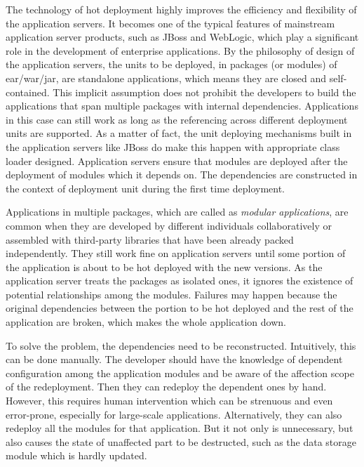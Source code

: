 \documentclass[conference]{IEEEtran}
\begin{document}
The technology of hot deployment highly improves the efficiency and flexibility of the application servers.
It becomes one of the typical features of mainstream application server products, such as JBoss\cite{jboss} and WebLogic\cite{weblogic}, which play a significant role in the development of enterprise applications. By the philosophy of design of the application servers, the units to be deployed, in packages (or modules) of ear/war/jar, are standalone applications, which means they are closed and self-contained. This implicit assumption does not prohibit the developers to build the applications that span multiple packages with internal dependencies. Applications in this case can still work as long as the referencing across different deployment units are supported. As a matter of fact, the unit deploying mechanisms built in the application servers like JBoss do make this happen with appropriate class loader designed. Application servers ensure that modules are deployed after the deployment of modules which it depends on. The dependencies are constructed in the context of deployment unit during the first time deployment.

Applications in multiple packages, which are called as \emph{modular applications}, are common when they are developed by different individuals collaboratively or assembled with third-party libraries that have been already packed independently. They still work fine on application servers until some portion of the application is about to be hot deployed  with the new versions. As the application server treats the packages as isolated ones, it ignores the existence of potential relationships among the modules. Failures may happen because the original dependencies between the portion to be hot deployed and the rest of the application are broken, which makes the whole application down.

To solve the problem, the dependencies need to be reconstructed. Intuitively, this can be done manually. The developer should have the knowledge of dependent configuration among the application modules and be aware of the affection scope of the redeployment. Then they can redeploy the dependent ones by hand. However, this requires human intervention which can be strenuous and even error-prone, especially for large-scale applications. Alternatively, they can also redeploy all the modules for that application. But it not only is unnecessary, but also causes the state of unaffected part to be destructed, such as the data storage module which is hardly updated. 
\end{document}
